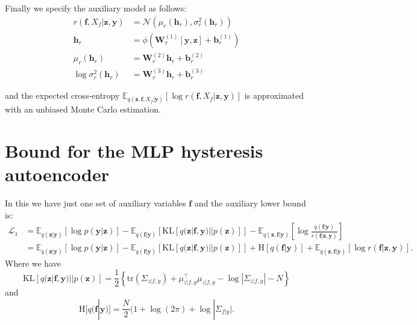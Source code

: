 \documentclass[12pt]{article}
\newcommand{\zb}{\mathbf{z}}
\newcommand{\fb}{\mathbf{f}}
\newcommand{\yb}{\mathbf{y}}
\newcommand{\Lo}{\mathcal{L}_1}
\newcommand{\Ex}{\mathbb{E}}
\newcommand{\KL}{\mathrm{KL}}
\newcommand{\No}{\mathcal{N}}
\newcommand{\Wb}{\mathbf{W}}
\newcommand{\hb}{\mathbf{h}}
\newcommand{\bb}{\mathbf{b}}
\begin{document}
%
Finally we specify the auxiliary model as follows:
%
\begin{align}
    r(\fb,X_f|\zb,\yb) &= \No(\mu_r(\hb_r), \sigma_r^2(\hb_r)) \\
    \hb_r &= \phi(\Wb^{(1)}_r [\yb,\zb] + \bb^{(1)}_r) \\
    \mu_r(\hb_r)&=\Wb^{(2)}_r \hb_r + \bb^{(2)}_r \\
    \log\sigma^2_r(\hb_r)&=\Wb^{(3)}_r \hb_r + \bb^{(3)}_r
\end{align}

and the expected cross-entropy $\Ex_{q(\zb,\fb,X_f|\yb)}\left[ \log r(\fb,X_f|\zb,\yb) \right]$ is approximated with an unbiased Monte Carlo estimation.
%
\section{Bound for the MLP hysteresis autoencoder}
%
In this we have just one set of auxiliary variables $\fb$ and the auxiliary lower bound is:
%
\begin{align}
    \Lo &= \Ex_{q(\zb|\yb)}[\log p(\yb|\zb)] - \Ex_{q(\fb|\yb)}\left[ \KL[q(\zb|\fb,\yb)||p(\zb)] \right] - \Ex_{q(\zb,\fb|\yb)}\left[ \log\frac{q(\fb|\yb)}{r(\fb|\zb,\yb)} \right]\\
    &= \Ex_{q(\zb|\yb)}[\log p(\yb|\zb)] - \Ex_{q(\fb|\yb)}\left[ \KL[q(\zb|\fb,\yb)||p(\zb)] \right] + \mathrm{H}[q(\fb|\yb)] + \Ex_{q(\zb,\fb|\yb)}[\log r(\fb|\zb,\yb)].
\end{align}
%
Where we have
%
\begin{equation}
    \KL[q(\zb|\fb,\yb)||p(\zb)] = \frac{1}{2}\left\{ \mathrm{tr}(\Sigma_{z|f,y}) + \mu_{z|f,y}^\top\mu_{z|f,y} - \log| \Sigma_{z|f,y} | - N \right\}
\end{equation}
%
and
%
\begin{equation}
    \mathrm{H}[q(\fb|\yb)] = \frac{N}{2}(1 + \log(2\pi) + \log | \Sigma_{f|y} |.
\end{equation}
\end{document}

